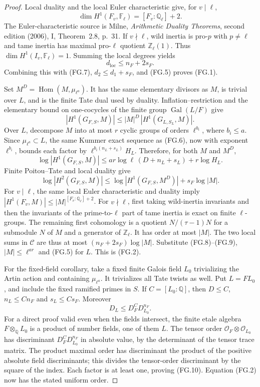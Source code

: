 \begin{proof}
Local duality and the local Euler characteristic give,
for $v\mid\ell$,
\[
      \dim H^1(F_v,\mathbb F_\ell)=[F_v:\mathbb Q_\ell]+2.
\]
The Euler-characteristic source is Milne,
\emph{Arithmetic Duality Theorems}, second edition (2006),
I, Theorem~2.8, p.~31.
If $v\nmid\ell$, wild inertia is pro-$p$ with $p\ne\ell$
and tame inertia has maximal pro-$\ell$ quotient
$\mathbb Z_\ell(1)$.  Thus
$\dim H^1(I_v,\mathbb F_\ell)=1$.
Summing the local degrees yields
\[
 d_{\mathrm{loc}}\leq n_F+2s_F.
\]
Combining this with (FG.7), $d_2\leq d_1+s_F$, and
(FG.5) proves (FG.1).

Set $M^D=\operatorname{Hom}(M,\mu_{\ell^a})$.
It has the same elementary divisors as $M$, is trivial
over $L$, and is the finite Tate dual used by duality.
Inflation--restriction and the elementary bound on
one-cocycles of the finite group $\operatorname{Gal}(L/F)$
give
\[
 |H^1(G_{F,S},M)|
 \leq |M|^D\,|H^1(G_{L,S_L},M)|.
\]
Over $L$, decompose $M$ into at most $r$ cyclic groups
of orders $\ell^{b_i}$, where $b_i\leq a$.
Since $\mu_{\ell^a}\subset L$, the same Kummer exact
sequence as (FG.6), now with exponent $\ell^{b_i}$,
bounds each factor by
$\ell^{b_i(n_L+s_L)}H_L$.  Therefore, for both $M$ and
$M^D$,
\[
 \log|H^1(G_{F,S},M)|
 \leq ar\log\ell\,(D+n_L+s_L)+r\log H_L.           \tag{FG.8}
\]
Finite Poitou--Tate and local duality give
\[
 \log|H^2(G_{F,S},M)|
 \leq\log|H^1(G_{F,S},M^D)|+s_F\log|M|.           \tag{FG.9}
\]
For $v\mid\ell$, the same local Euler characteristic
and duality imply
$|H^1(F_v,M)|\leq|M|^{[F_v:\mathbb Q_\ell]+2}$.
For $v\nmid\ell$, first taking wild-inertia invariants
and then the invariants of the prime-to-$\ell$ part of
tame inertia is exact on finite $\ell$-groups.
The remaining first cohomology is a quotient
$N/(\tau-1)N$ for a submodule $N$ of $M$ and a
generator of $\mathbb Z_\ell$.  It has order at most
$|M|$.  The two local sums in $\mathcal C$ are thus at
most $(n_F+2s_F)\log|M|$.
Substitute (FG.8)--(FG.9), $|M|\leq\ell^{ar}$ and
(FG.5) for $L$.  This is (FG.2).

For the fixed-field corollary, take a fixed finite
Galois field $L_0$ trivializing the Artin action and
containing $\mu_{\ell^a}$.  It trivializes all Tate
twists as well.  Put $L=FL_0$, and include the fixed
ramified primes in $S$.  If $C=[L_0:\mathbb Q]$, then
$D\leq C$, $n_L\leq Cn_F$ and $s_L\leq Cs_F$.
Moreover
\[
             D_L\leq D_F^C D_{L_0}^{n_F}.            \tag{FG.10}
\]
For a direct proof valid even when the fields intersect,
the finite etale algebra $F\otimes_{\mathbb Q}L_0$ is
a product of number fields, one of them $L$.
The tensor order $\mathcal O_F\otimes\mathcal O_{L_0}$
has discriminant $D_F^C D_{L_0}^{n_F}$ in absolute value,
by the determinant of the tensor trace matrix.
The product maximal order has discriminant the product
of the positive absolute field discriminants; this
divides the tensor-order discriminant by the square
of the index.  Each factor is at least one, proving
(FG.10).  Equation (FG.2) now has the stated uniform order.


\end{proof}
